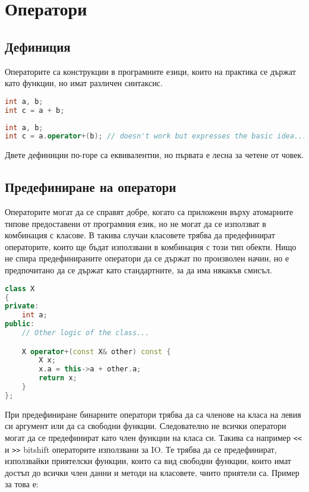 \documentclass[fleqn,12pt]{article}
\begin{document}
\section{Оператори}
\subsection{Дефиниция}
Операторите са конструкции в програмните езици, които на практика се държат като функции, но имат различен синтаксис. 

\begin{lstlisting}[language=C++, caption=Example use of operators]
int a, b;
int c = a + b;
\end{lstlisting}

\begin{lstlisting}[language=C++, caption=Equivalent use of operators]
int a, b;
int c = a.operator+(b); // doesn't work but expresses the basic idea...
\end{lstlisting}

Двете дефиниции по-горе са еквивалентни, но първата е лесна за четене от човек.


\subsection{Предефиниране на оператори}
Операторите могат да се справят добре, когато са приложени върху атомарните типове предоставени от програмния език, но не могат да се използват в комбинация с класове. В такива случаи класовете трябва да предефинират операторите, които ще бъдат използвани в комбинация с този тип обекти. Нищо не спира предефинираните оператори да се държат по произволен начин, но е предпочитано да се държат като стандартните, за да има някакъв смисъл.

\begin{lstlisting}[language=C++, caption=Example overriding of an operator]
class X
{
private:
    int a;
public:
    // Other logic of the class...

    X operator+(const X& other) const {
        X x;
        x.a = this->a + other.a;
        return x;
    }
};
\end{lstlisting}

При предефиниране бинарните оператори трябва да са членове на класа на левия си аргумент или да са свободни функции.
Следователно не всички оператори могат да се предефинират като член функции на класа си.
Такива са например \texttt{<<} и \texttt{>>} bitshift операторите използвани за IO.
Те трябва да се предефинират, използвайки приятелски функции, които са вид свободни функции, които имат достъп до всички член данни и методи на класовете, чиито приятели са.
Пример за това е:
\end{document}
